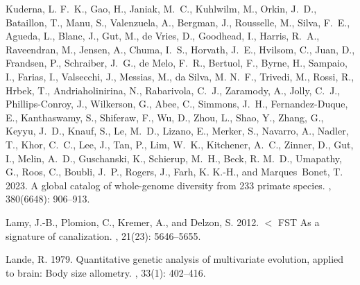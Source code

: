 \documentclass{article}
\begin{document}
\begin{thebibliography}{}
    Kuderna, L. F.~K., Gao, H., Janiak, M.~C., Kuhlwilm, M., Orkin, J.~D.,
    Bataillon, T., Manu, S., Valenzuela, A., Bergman, J., Rousselle, M., Silva,
    F.~E., Agueda, L., Blanc, J., Gut, M., {de Vries}, D., Goodhead, I., Harris,
    R.~A., Raveendran, M., Jensen, A., Chuma, I.~S., Horvath, J.~E., Hvilsom, C.,
    Juan, D., Frandsen, P., Schraiber, J.~G., {de Melo}, F.~R., Bertuol, F.,
    Byrne, H., Sampaio, I., Farias, I., Valsecchi, J., Messias, M., {da Silva},
    M. N.~F., Trivedi, M., Rossi, R., Hrbek, T., Andriaholinirina, N.,
    Rabarivola, C.~J., Zaramody, A., Jolly, C.~J., {Phillips-Conroy}, J.,
    Wilkerson, G., Abee, C., Simmons, J.~H., {Fernandez-Duque}, E., Kanthaswamy,
    S., Shiferaw, F., Wu, D., Zhou, L., Shao, Y., Zhang, G., Keyyu, J.~D., Knauf,
    S., Le, M.~D., Lizano, E., Merker, S., Navarro, A., Nadler, T., Khor, C.~C.,
    Lee, J., Tan, P., Lim, W.~K., Kitchener, A.~C., Zinner, D., Gut, I., Melin,
    A.~D., Guschanski, K., Schierup, M.~H., Beck, R. M.~D., Umapathy, G., Roos,
    C., Boubli, J.~P., Rogers, J., Farh, K. K.-H., and Marques~Bonet, T. 2023.
    \newblock A global catalog of whole-genome diversity from 233 primate species.
    , {380}(6648): 906--913.

    Lamy, J.-B., Plomion, C., Kremer, A., and Delzon, S. 2012.
     {$<$} {{FST As}} a signature of canalization.
    , {21}(23): 5646--5655.

    Lande, R. 1979.
    \newblock Quantitative genetic analysis of multivariate evolution, applied to
    brain: Body size allometry.
    , {33}(1): 402--416.


\end{thebibliography}
\end{document}
